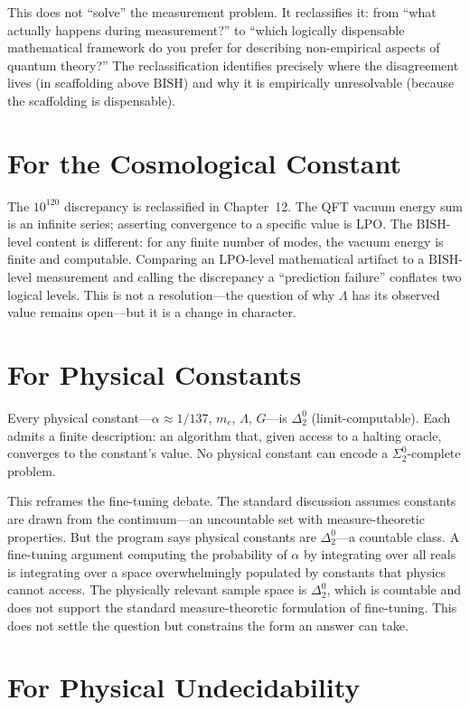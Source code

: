 \documentclass[11pt,a4paper]{report}
\theoremstyle{plain}
\theoremstyle{definition}
\theoremstyle{remark}
\newcommand{\BISH}{\mathrm{BISH}}
\newcommand{\LPO}{\mathrm{LPO}}
\begin{document}
This does not ``solve'' the measurement problem. It reclassifies it: from ``what actually happens during measurement?'' to ``which logically dispensable mathematical framework do you prefer for describing non-empirical aspects of quantum theory?'' The reclassification identifies precisely where the disagreement lives (in scaffolding above $\BISH$) and why it is empirically unresolvable (because the scaffolding is dispensable).

\section{For the Cosmological Constant}

The $10^{120}$ discrepancy is reclassified in Chapter~12. The QFT vacuum energy sum is an infinite series; asserting convergence to a specific value is $\LPO$. The $\BISH$-level content is different: for any finite number of modes, the vacuum energy is finite and computable. Comparing an $\LPO$-level mathematical artifact to a $\BISH$-level measurement and calling the discrepancy a ``prediction failure'' conflates two logical levels. This is not a resolution---the question of why $\Lambda$ has its observed value remains open---but it is a change in character.

\section{For Physical Constants}

Every physical constant---$\alpha \approx 1/137$, $m_e$, $\Lambda$, $G$---is $\Delta^0_2$ (limit-computable). Each admits a finite description: an algorithm that, given access to a halting oracle, converges to the constant's value. No physical constant can encode a $\Sigma^0_2$-complete problem.

This reframes the fine-tuning debate. The standard discussion assumes constants are drawn from the continuum---an uncountable set with measure-theoretic properties. But the program says physical constants are $\Delta^0_2$---a countable class. A fine-tuning argument computing the probability of $\alpha$ by integrating over all reals is integrating over a space overwhelmingly populated by constants that physics cannot access. The physically relevant sample space is $\Delta^0_2$, which is countable and does not support the standard measure-theoretic formulation of fine-tuning. This does not settle the question but constrains the form an answer can take.

\section{For Physical Undecidability}
\end{document}
